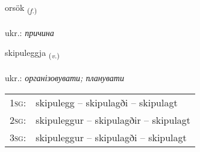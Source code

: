 \documentclass[frontgrid, backgrid]{flacards}\usepackage[]{graphicx}\usepackage[]{xcolor}
\begin{document}
\renewcommand{\flhead}{\vskip5pt \fboxsep=0pt {\small\bfseries\footnotesize Nafnorð | іменник}}
\renewcommand{\fcfoot}{\vskip5pt \fboxsep=0pt \hspace{2pt}{\small\bfseries\footnotesize 2K}}

\renewcommand{\blhead}{\vskip5pt {\small\bfseries\footnotesize Nafnorð | іменник }}
\renewcommand{\bcfoot}{\vskip5pt \hspace{2pt}{\small\bfseries\footnotesize 2K}}


{orsök \small{\textsubscript{(\textit{f.})}} \\[1ex] %
\textphonetic{[ɔr̥sœk]} \\
ukr.: \emph{причина} \\  [2ex]
\renewcommand*{\arraystretch}{0.8}
}

\renewcommand{\flhead}{\vskip5pt \fboxsep=0pt {\small\bfseries\footnotesize Sagnorð | дієслово}}
\renewcommand{\fcfoot}{\vskip5pt \fboxsep=0pt \hspace{2pt}{\small\bfseries\footnotesize 2K}}

\renewcommand{\blhead}{\vskip5pt {\small\bfseries\footnotesize Sagnorð | дієслово }}
\renewcommand{\bcfoot}{\vskip5pt \hspace{2pt}{\small\bfseries\footnotesize 2K}}


{skipuleggja \small{\textsubscript{(\textit{v.})}} \\[1ex] %
\textphonetic{[scɪːpʏlɛca]} \\
ukr.: \emph{організовувати; планувати} \\  [2ex]
\renewcommand*{\arraystretch}{0.8}
\begin{tabular}{p{1cm}l}
\textsc{1sg}: & skipulegg -- skipulagði -- skipulagt \\ 
\textsc{2sg}: & skipuleggur -- skipulagðir -- skipulagt \\ 
\textsc{3sg}: & skipuleggur -- skipulagði -- skipulagt \\ 
\end{tabular}
}
\end{document}

